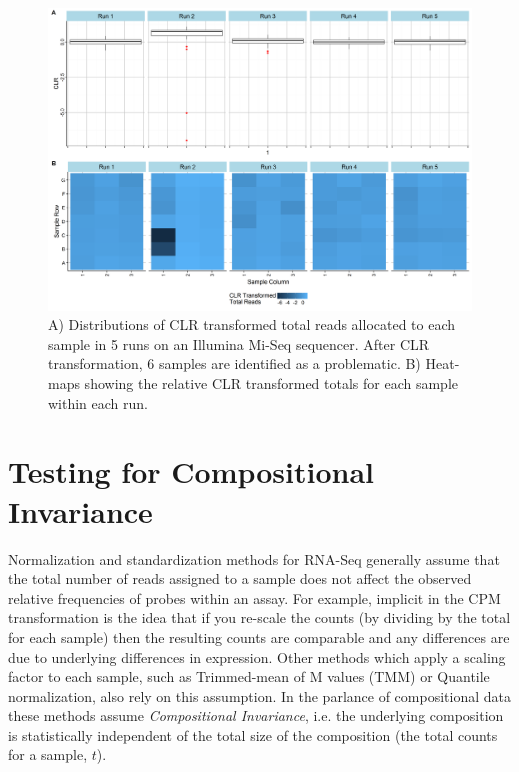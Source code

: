 \documentclass{article}\usepackage[]{graphicx}\usepackage[]{color}
\theoremstyle{definition}
\begin{document}
\begin{figure}
\includegraphics[scale=.5]{./Figures/IO_Repro_Combined_CLR}
\caption{A) Distributions of CLR transformed total reads allocated to each sample in 5 runs on an Illumina Mi-Seq sequencer. After CLR transformation, 6 samples are identified as a problematic. B) Heat-maps showing the relative CLR transformed totals for each sample within each run.}
\label{clrFig}
\end{figure}

\FloatBarrier
\section{Testing for Compositional Invariance}




Normalization and standardization methods for RNA-Seq generally assume that the total number of reads assigned to a sample does not affect the observed relative frequencies of probes within an assay.  For example, implicit in the CPM transformation is the idea that if you re-scale the counts (by dividing by the total for each sample) then the resulting counts are comparable and any differences are due to underlying differences in expression.  Other methods which apply a scaling factor to each sample, such as Trimmed-mean of M values (TMM) or Quantile normalization, also rely on this assumption.  In the parlance of compositional data these methods assume \emph{Compositional Invariance}, i.e. the underlying composition is statistically independent of the total size of the composition (the total counts for a sample, $t$).\\
\end{document}
